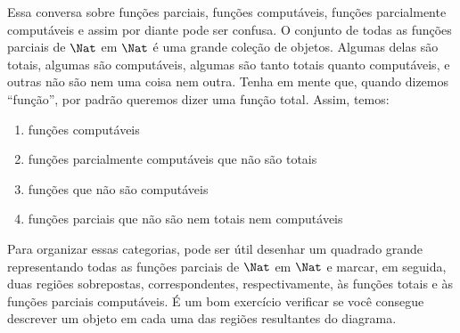\documentclass[../../../include/open-logic-section]{subfiles}
\begin{document}
Essa conversa sobre funções parciais, funções computáveis, funções
parcialmente computáveis e assim por diante pode ser confusa. O
conjunto de todas as funções parciais de $\Nat$ em $\Nat$ é uma grande
coleção de objetos. Algumas delas são totais, algumas são computáveis,
algumas são tanto totais quanto computáveis, e outras não são nem uma
coisa nem outra. Tenha em mente que, quando dizemos ``função'', por
padrão queremos dizer uma função total. Assim, temos:
\begin{enumerate}
\item funções computáveis
\item funções parcialmente computáveis que não são totais
\item funções que não são computáveis
\item funções parciais que não são nem totais nem computáveis
\end{enumerate}
Para organizar essas categorias, pode ser útil desenhar um quadrado
grande representando todas as funções parciais de $\Nat$ em $\Nat$ e
marcar, em seguida, duas regiões sobrepostas, correspondentes,
respectivamente, às funções totais e às funções parciais computáveis.
É um bom exercício verificar se você consegue descrever um objeto em
cada uma das regiões resultantes do diagrama.
\end{document}
